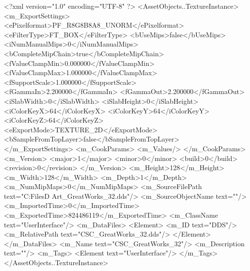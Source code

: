 <?xml version="1.0" encoding="UTF-8" ?>
<AssetObjects..TextureInstance>
	<m_ExportSettings>
		<ePixelformat>PF_R8G8B8A8_UNORM</ePixelformat>
		<eFilterType>FT_BOX</eFilterType>
		<bUseMips>false</bUseMips>
		<iNumManualMips>0</iNumManualMips>
		<bCompleteMipChain>true</bCompleteMipChain>
		<fValueClampMin>0.000000</fValueClampMin>
		<fValueClampMax>1.000000</fValueClampMax>
		<fSupportScale>1.000000</fSupportScale>
		<fGammaIn>2.200000</fGammaIn>
		<fGammaOut>2.200000</fGammaOut>
		<iSlabWidth>0</iSlabWidth>
		<iSlabHeight>0</iSlabHeight>
		<iColorKeyX>64</iColorKeyX>
		<iColorKeyY>64</iColorKeyY>
		<iColorKeyZ>64</iColorKeyZ>
		<eExportMode>TEXTURE_2D</eExportMode>
		<bSampleFromTopLayer>false</bSampleFromTopLayer>
	</m_ExportSettings>
	<m_CookParams>
		<m_Values/>
	</m_CookParams>
	<m_Version>
		<major>1</major>
		<minor>0</minor>
		<build>0</build>
		<revision>0</revision>
	</m_Version>
	<m_Height>128</m_Height>
	<m_Width>128</m_Width>
	<m_Depth>1</m_Depth>
	<m_NumMipMaps>0</m_NumMipMaps>
	<m_SourceFilePath text="C:\Users\Shadow\Desktop\Working Files\2D Art\GreatWorks\CSC_GreatWorks_32.dds"/>
	<m_SourceObjectName text=""/>
	<m_ImportedTime>0</m_ImportedTime>
	<m_ExportedTime>824486119</m_ExportedTime>
	<m_ClassName text="UserInterface"/>
	<m_DataFiles>
		<Element>
			<m_ID text="DDS"/>
			<m_RelativePath text="CSC_GreatWorks_32.dds"/>
		</Element>
	</m_DataFiles>
	<m_Name text="CSC_GreatWorks_32"/>
	<m_Description text=""/>
	<m_Tags>
		<Element text="UserInterface"/>
	</m_Tags>
</AssetObjects..TextureInstance>

